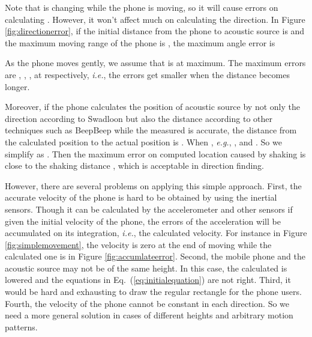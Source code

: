 \documentclass[]{sig-alternate-10pt}
\def\ie{\textit{i.e.}\xspace}
\def\eg{\textit{e.g.}\xspace}
\newcommand{\eqqref}[1]{Eq.~(\ref{#1})}
\def \ourprotocol{Swadloon\xspace}
\begin{document}
Note that  is changing while the phone is moving, so it will
cause errors on calculating . However, it won't affect much
on calculating the direction. In Figure \ref{fig:directionerror}, if the initial distance from the
phone to acoustic source is  and the maximum moving range of the
phone is , the maximum angle error is

As the phone moves gently, we assume that  is  at maximum.
The maximum errors are , , ,  at  respectively, \ie,
the errors get smaller when the distance becomes longer.

Moreover, if the phone calculates
the position of acoustic source by not only the direction 
according to \ourprotocol but also the distance  according to other
techniques such as BeepBeep
\cite{2007-SenSys-BeepBeephighaccuracy} while the measured
 is accurate, the distance   from the calculated position to the actual position is
.
When , \eg, ,  and
. So we simplify  as
.
Then the maximum error on computed location caused by shaking is 
close to the shaking distance , which is acceptable in direction finding.

However, there are several problems on applying this simple approach.
First, the accurate velocity of the phone is hard to be  obtained by
using the inertial sensors. Though it can be calculated by the
accelerometer and other sensors if given the initial velocity of the
phone, the errors of the acceleration will be accumulated on its
integration, \ie, the calculated velocity. For instance in Figure
\ref{fig:simplemovement}, the velocity is zero at the end of moving
while the calculated one is  in Figure \ref{fig:accumlateerror}. Second, the mobile
phone and the acoustic source may not be of the same height. In this
case, the calculated  is lowered and the equations in
\eqqref{eq:initialequation} are not right. Third, it would be hard and
exhausting to draw the regular rectangle  for the
phone users. Fourth, the velocity of the phone  cannot be constant in each
direction.
So we  need a more general solution in cases of different heights and
arbitrary motion patterns.
\end{document}
